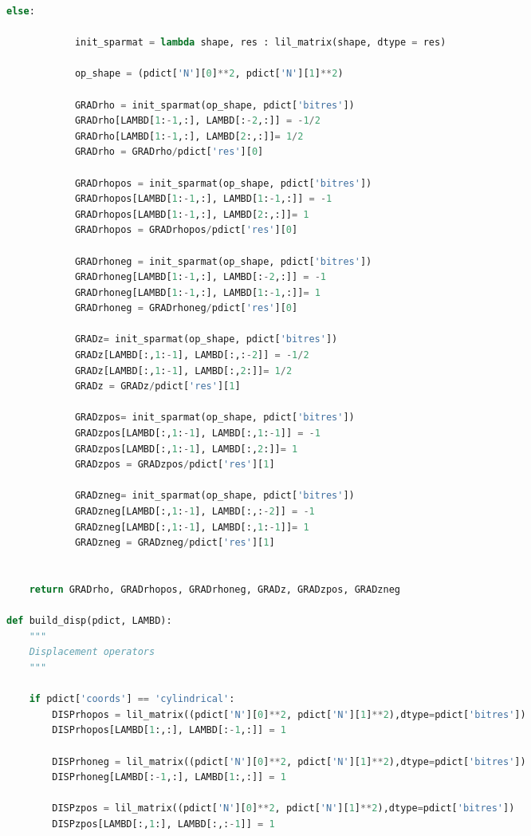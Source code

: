 \begin{spacing}{1.2}
\begin{lstlisting}[frame=single, language=Python]
        else:
            
            init_sparmat = lambda shape, res : lil_matrix(shape, dtype = res)
            
            op_shape = (pdict['N'][0]**2, pdict['N'][1]**2)
            
            GRADrho = init_sparmat(op_shape, pdict['bitres'])
            GRADrho[LAMBD[1:-1,:], LAMBD[:-2,:]] = -1/2
            GRADrho[LAMBD[1:-1,:], LAMBD[2:,:]]= 1/2
            GRADrho = GRADrho/pdict['res'][0]

            GRADrhopos = init_sparmat(op_shape, pdict['bitres'])
            GRADrhopos[LAMBD[1:-1,:], LAMBD[1:-1,:]] = -1
            GRADrhopos[LAMBD[1:-1,:], LAMBD[2:,:]]= 1
            GRADrhopos = GRADrhopos/pdict['res'][0]

            GRADrhoneg = init_sparmat(op_shape, pdict['bitres'])
            GRADrhoneg[LAMBD[1:-1,:], LAMBD[:-2,:]] = -1
            GRADrhoneg[LAMBD[1:-1,:], LAMBD[1:-1,:]]= 1
            GRADrhoneg = GRADrhoneg/pdict['res'][0]

            GRADz= init_sparmat(op_shape, pdict['bitres'])
            GRADz[LAMBD[:,1:-1], LAMBD[:,:-2]] = -1/2
            GRADz[LAMBD[:,1:-1], LAMBD[:,2:]]= 1/2
            GRADz = GRADz/pdict['res'][1]

            GRADzpos= init_sparmat(op_shape, pdict['bitres'])
            GRADzpos[LAMBD[:,1:-1], LAMBD[:,1:-1]] = -1
            GRADzpos[LAMBD[:,1:-1], LAMBD[:,2:]]= 1
            GRADzpos = GRADzpos/pdict['res'][1]

            GRADzneg= init_sparmat(op_shape, pdict['bitres'])
            GRADzneg[LAMBD[:,1:-1], LAMBD[:,:-2]] = -1
            GRADzneg[LAMBD[:,1:-1], LAMBD[:,1:-1]]= 1
            GRADzneg = GRADzneg/pdict['res'][1]
        
        
    return GRADrho, GRADrhopos, GRADrhoneg, GRADz, GRADzpos, GRADzneg

def build_disp(pdict, LAMBD):
    """
    Displacement operators
    """
    
    if pdict['coords'] == 'cylindrical':
        DISPrhopos = lil_matrix((pdict['N'][0]**2, pdict['N'][1]**2),dtype=pdict['bitres'])
        DISPrhopos[LAMBD[1:,:], LAMBD[:-1,:]] = 1

        DISPrhoneg = lil_matrix((pdict['N'][0]**2, pdict['N'][1]**2),dtype=pdict['bitres'])
        DISPrhoneg[LAMBD[:-1,:], LAMBD[1:,:]] = 1

        DISPzpos = lil_matrix((pdict['N'][0]**2, pdict['N'][1]**2),dtype=pdict['bitres'])
        DISPzpos[LAMBD[:,1:], LAMBD[:,:-1]] = 1


\end{lstlisting}
\end{spacing}
